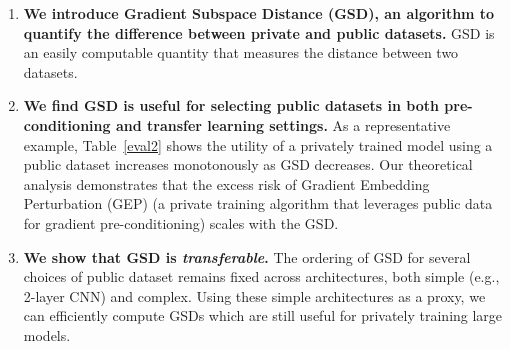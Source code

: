 \documentclass[11pt]{article}
\begin{document}
\begin{enumerate}
    \item \textbf{We introduce Gradient Subspace Distance (GSD), an algorithm to quantify the difference between private and public datasets.} 
    GSD is an easily computable quantity that measures the distance between two datasets.     
    \item \textbf{We find GSD is useful for selecting public datasets in both pre-conditioning and transfer learning settings.} 
    As a representative example, Table~\ref{eval2} shows the utility of a privately trained model using a public dataset increases monotonously as GSD decreases.
    Our theoretical analysis demonstrates that the excess risk of Gradient Embedding Perturbation (GEP) (a private training algorithm that leverages public data for gradient pre-conditioning) scales with the GSD. %
    \item \textbf{We show that GSD is \textit{transferable}.} 
    The ordering of GSD for several choices of public dataset remains fixed across architectures,  both simple (e.g., 2-layer CNN) and complex. Using these simple architectures as a proxy, we can efficiently compute GSDs which are still useful for privately training large models.



\end{enumerate}
\end{document}
